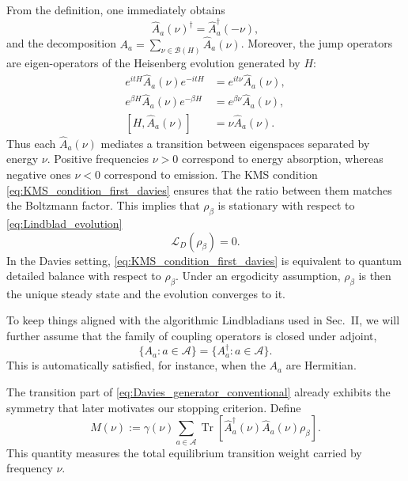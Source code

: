 \documentclass[showpacs,amsmath,amssymb,twocolumn,prx,superscriptaddress,10pt,aps,nofootinbib]{revtex4-2}
\begin{document}
From the definition, one immediately obtains
\begin{equation}
\label{eq:Dagger_relation_davies_jumps}
    \hat A_a(\nu)^\dagger=\hat A_a^\dagger(-\nu),
\end{equation}
and the decomposition $A_a=\sum_{\nu\in\mathcal{B}(H)}\hat A_a(\nu)$. Moreover, the jump operators are eigen-operators of the Heisenberg evolution generated by $H$:
\begin{align}
\label{eq:Commutation_relation_davies_jumps}
    e^{itH}\hat A_a(\nu)e^{-itH}&=e^{it\nu}\hat A_a(\nu), \\
    e^{\beta H}\hat A_a(\nu)e^{-\beta H}&=e^{\beta\nu}\hat A_a(\nu), \\
    [H,\hat A_a(\nu)]&=\nu \hat A_a(\nu).
\end{align}
Thus each $\hat A_a(\nu)$ mediates a transition between eigenspaces separated by energy $\nu$. Positive frequencies $\nu >0$ correspond to energy absorption, whereas negative ones $\nu <0$ correspond to emission. The KMS condition \eqref{eq:KMS_condition_first_davies} ensures that the ratio between them matches the Boltzmann factor. This implies that $\rho_\beta$ is stationary with respect to \eqref{eq:Lindblad_evolution}
\begin{equation}
\label{eq:Gibbs_is_steady_of_Davies}
    \mathcal{L}_D(\rho_\beta)=0.
\end{equation}
In the Davies setting, \eqref{eq:KMS_condition_first_davies} is equivalent to quantum detailed balance with respect to $\rho_\beta$. Under an ergodicity assumption, $\rho_\beta$ is then the unique steady state and the evolution converges to it.

To keep things aligned with the algorithmic Lindbladians used in Sec.~II, we will further assume that the family of coupling operators is closed under adjoint,
\begin{equation}
\label{eq:adjoint_assum}
    \{A_a:a\in\mathcal{A}\}=\{A_a^\dagger:a\in\mathcal{A}\}.
\end{equation}
This is automatically satisfied, for instance, when the $A_a$ are Hermitian.

The transition part of \eqref{eq:Davies_generator_conventional} already exhibits the symmetry that later motivates our stopping criterion. Define
\begin{equation}
    M(\nu):=\gamma(\nu)\sum_{a\in\mathcal{A}}
    \operatorname{Tr}\!\left[\hat A_a^\dagger(\nu)\hat A_a(\nu)\rho_\beta\right].
\end{equation}
This quantity measures the total equilibrium transition weight carried by frequency $\nu$.
\end{document}
